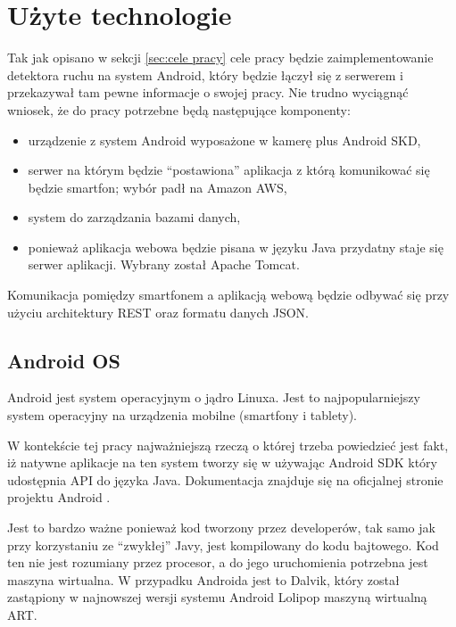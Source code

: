 \chapter{Użyte technologie}
\label{cha:użyte technologie}

Tak jak opisano w sekcji \ref{sec:cele pracy} cele pracy będzie zaimplementowanie detektora ruchu na system Android, który będzie łączył się z serwerem i przekazywał tam pewne informacje o swojej pracy. Nie trudno wyciągnąć wniosek, że do pracy potrzebne będą następujące komponenty:

\begin{itemize}
	\item urządzenie z system Android wyposażone w kamerę plus Android SKD,
	\item serwer na którym będzie ``postawiona'' aplikacja z którą komunikować się będzie smartfon; wybór padł na Amazon AWS,
	\item system do zarządzania bazami danych,
	\item ponieważ aplikacja webowa będzie pisana w języku Java przydatny staje się serwer aplikacji. Wybrany został Apache Tomcat. 	
\end{itemize}

Komunikacja pomiędzy smartfonem a aplikacją webową będzie odbywać się przy użyciu architektury REST oraz formatu danych JSON. 

\section{Android OS}
\label{sec:android}

Android jest system operacyjnym o jądro Linuxa. Jest to najpopularniejszy system operacyjny na urządzenia mobilne (smartfony i tablety). 

W kontekście tej pracy najważniejszą rzeczą o której trzeba powiedzieć jest fakt, iż natywne aplikacje na ten system tworzy się w używając Android SDK który udostępnia API do języka Java. Dokumentacja znajduje się na oficjalnej stronie projektu Android \cite{Androiddocs}.

Jest to bardzo ważne ponieważ kod tworzony przez developerów, tak samo jak przy korzystaniu ze ``zwykłej'' Javy, jest kompilowany do kodu bajtowego. Kod ten nie jest rozumiany przez procesor, a do jego uruchomienia potrzebna jest maszyna wirtualna. W przypadku Androida jest to Dalvik, który został zastąpiony w najnowszej wersji systemu Android Lolipop maszyną wirtualną ART.

